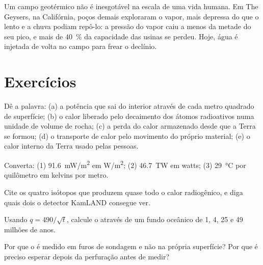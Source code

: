 Um campo geotérmico não é inesgotável na escala de uma vida humana. Em The
Geysers, na Califórnia, poços demais exploraram o vapor, mais depressa do
que o lento  e a chuva podiam repô-lo: a pressão do vapor caiu
a menos da metade do seu pico, e mais de \qty{40}{\percent} da capacidade
das usinas se perdeu. Hoje, água é injetada de volta no campo para frear o
declínio.

\section{Exercícios}

\begin{exercise}[$\star$]\label{exo:g12:internal-heat:1}
Dê a palavra: (a) a potência que sai do interior através de cada metro
quadrado de superfície; (b) o calor liberado pelo decaimento dos átomos
radioativos numa unidade de volume de rocha; (c) a perda do calor armazenado
desde que a Terra se formou; (d) o transporte de calor pelo movimento do
próprio material; (e) o calor interno da Terra usado pelas pessoas.
\end{exercise}

\begin{exercise}[$\star$]\label{exo:g12:internal-heat:2}
Converta: (1) \qty{91.6}{mW/m^2} em \unit{W/m^2}; (2) \qty{46.7}{TW} em
watts; (3) \qty{29}{\celsius} por quilômetro em kelvins por metro.
\end{exercise}

\begin{exercise}[$\star$]\label{exo:g12:internal-heat:3}
Cite os quatro isótopos que produzem quase todo o calor radiogênico, e diga
quais dois o detector KamLAND consegue ver.
\end{exercise}

\begin{exercise}[$\star$]\label{exo:g12:internal-heat:4}
Usando $q = 490/\sqrt{t}$, calcule o  através de um fundo
oceânico de 1, 4, 25 e 49 milhões de anos.
\end{exercise}

\begin{exercise}[$\star$]\label{exo:g12:internal-heat:5}
Por que o  é medido em furos de sondagem e não na própria
superfície? Por que é preciso esperar depois da perfuração antes de medir?
\end{exercise}

